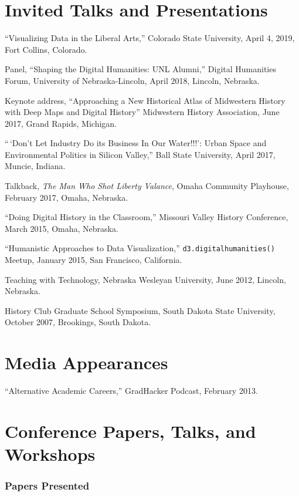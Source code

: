 \hypertarget{invited-talks-and-presentations}{%
\section{Invited Talks and
Presentations}\label{invited-talks-and-presentations}}

``Visualizing Data in the Liberal Arts,'' Colorado State University,
April 4, 2019, Fort Collins, Colorado.

Panel, ``Shaping the Digital Humanities: UNL Alumni,'' Digital
Humanities Forum, University of Nebraska-Lincoln, April 2018, Lincoln,
Nebraska.

Keynote address, ``Approaching a New Historical Atlas of Midwestern
History with Deep Maps and Digital History'' Midwestern History
Association, June 2017, Grand Rapids, Michigan.

``\,`Don't Let Industry Do its Business In Our Water!!!': Urban Space
and Environmental Politics in Silicon Valley,'' Ball State University,
April 2017, Muncie, Indiana.

Talkback, \emph{The Man Who Shot Liberty Valance}, Omaha Community
Playhouse, February 2017, Omaha, Nebraska.

``Doing Digital History in the Classroom,'' Missouri Valley History
Conference, March 2015, Omaha, Nebraska.

``Humanistic Approaches to Data Visualization,''
\texttt{d3.digitalhumanities()} Meetup, January 2015, San Francisco,
California.

Teaching with Technology, Nebraska Wesleyan University, June 2012,
Lincoln, Nebraska.

History Club Graduate School Symposium, South Dakota State University,
October 2007, Brookings, South Dakota.

\hypertarget{media-appearances}{%
\section{Media Appearances}\label{media-appearances}}

``Alternative Academic Careers,'' GradHacker Podcast, February 2013.

\hypertarget{conference-papers-talks-and-workshops}{%
\section{Conference Papers, Talks, and
Workshops}\label{conference-papers-talks-and-workshops}}

\hypertarget{papers-presented}{%
\subsubsection{Papers Presented}\label{papers-presented}}

